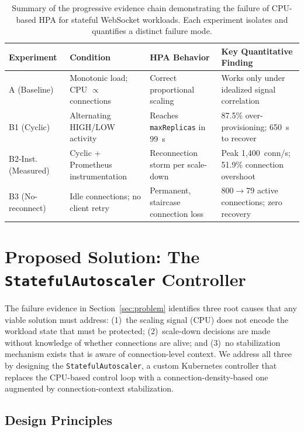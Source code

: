 \documentclass[twocolumn]{svjour3}
\begin{document}
\begin{table}[t]
\centering
\caption{Summary of the progressive evidence chain demonstrating the failure of CPU-based HPA for stateful WebSocket workloads. Each experiment isolates and quantifies a distinct failure mode.}
\label{tab:failure_summary}
\begin{tabular}{@{}p{2.2cm}p{3.5cm}p{3.5cm}p{5cm}@{}}
\toprule
\rowcolor{gray!12}
\textbf{Experiment} & \textbf{Condition} & \textbf{HPA Behavior} & \textbf{Key Quantitative Finding} \\
\midrule
A (Baseline) & Monotonic load; CPU $\propto$ connections & Correct proportional scaling & Works only under idealized signal correlation \\
B1 (Cyclic) & Alternating HIGH/LOW activity & Reaches \texttt{maxReplicas} in 99~s & 87.5\% over-provisioning; 650~s to recover \\
B2-Inst. (Measured) & Cyclic + Prometheus instrumentation & Reconnection storm per scale-down & Peak 1,400~conn/s; 51.9\% connection overshoot \\
B3 (No-reconnect) & Idle connections; no client retry & Permanent, staircase connection loss & 800$\rightarrow$79 active connections; zero recovery \\
\bottomrule
\end{tabular}
\end{table}


\section{Proposed Solution: The \texttt{StatefulAutoscaler} Controller}
\label{sec:controller}

The failure evidence in Section~\ref{sec:problem} identifies three root causes that any viable solution must address: (1)~the scaling signal (CPU) does not encode the workload state that must be protected; (2)~scale-down decisions are made without knowledge of whether connections are alive; and (3)~no stabilization mechanism exists that is aware of connection-level context. We address all three by designing the \texttt{StatefulAutoscaler}, a custom Kubernetes controller that replaces the CPU-based control loop with a connection-density-based one augmented by connection-context stabilization.

\subsection{Design Principles}
\end{document}
